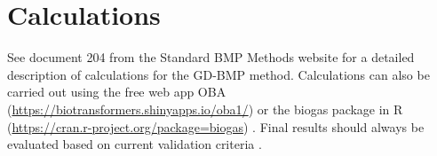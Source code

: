 \documentclass[]{article}
\begin{document}
\section{Calculations}
See document 204 from the Standard BMP Methods website \citep{BMPdoc204gasdens} for a detailed description of calculations for the GD-BMP method.
Calculations can also be carried out using the free web app OBA (\url{https://biotransformers.shinyapps.io/oba1/}) or the biogas package in R (\url{https://cran.r-project.org/package=biogas}) \citep{hafnerSoftwareBiogasResearch2018}.
Final results should always be evaluated based on current validation criteria \citep{BMPdoc100req}.


\end{document}
